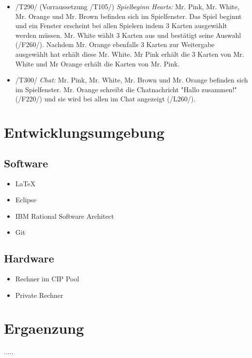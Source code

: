 \documentclass{article}
\begin{document}
\begin{itemize}
\begin{itemize}
		\item /T290/ (Vorraussetzung /T105/) \textit{Spielbeginn Hearts:} Mr. Pink, Mr. White, Mr. Orange und Mr. Brown befinden sich im Spielfenster. Das Spiel beginnt und ein Fenster erscheint bei allen Spielern indem 3 Karten ausgewählt werden müssen. Mr. White wählt 3 Karten aus und bestätigt seine Auswahl (/F260/). Nachdem Mr. Orange ebenfalls 3 Karten zur Weitergabe ausgewählt hat erhält diese Mr. White. Mr Pink erhält die 3 Karten von Mr. White und  Mr Orange erhält die Karten von Mr. Pink.
	
		\item /T300/ \textit{Chat:} Mr. Pink, Mr. White, Mr. Brown und Mr. Orange befinden sich im Spielfenster. Mr. Orange schreibt die Chatnachricht "Hallo zusammen!" (/F220/) und sie wird bei allen im Chat angezeigt (/L260/).
		
	\end{itemize}
\end{itemize}

\section{Entwicklungsumgebung}
\subsection{Software}
\begin{itemize}
	\item LaTeX
	\item Eclipse
	\item IBM Rational Software Architect
	\item Git
\end{itemize}

\subsection{Hardware}
\begin{itemize}
	\item Rechner im CIP Pool	
	\item Private Rechner
\end{itemize}

\section{Ergaenzung}
..... 
\newpage
\printglossaries
\end{document}
